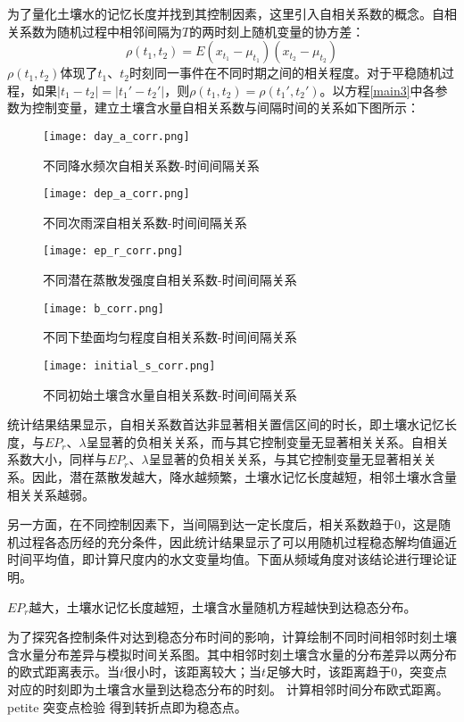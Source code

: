 为了量化土壤水的记忆长度并找到其控制因素，这里引入自相关系数的概念。自相关系数为随机过程中相邻间隔为$T$的两时刻上随机变量的协方差：
\begin{equation}
\rho(t_1,t_2)=E(x_{t_1}-\mu_{t_1})(x_{t_2}-\mu_{t_2})
\end{equation}
$\rho (t_1,t_2)$体现了$t_1$、$t_2$时刻同一事件在不同时期之间的相关程度。对于平稳随机过程，如果$|t_1-t_2|=|t_1'-t_2'|$，则$\rho (t_1,t_2)=\rho (t_1',t_2')$。以方程\ref{main3}中各参数为控制变量，建立土壤含水量自相关系数与间隔时间的关系如下图所示：
\begin{figure}[H]
\centering
\texttt{[image: day\_a\_corr.png]}
\caption{不同降水频次自相关系数-时间间隔关系} 
\end{figure}
\begin{figure}[H]
\centering
\texttt{[image: dep\_a\_corr.png]}
\caption{不同次雨深自相关系数-时间间隔关系} 
\end{figure}
\begin{figure}[H]
\centering
\texttt{[image: ep\_r\_corr.png]} 
\caption{不同潜在蒸散发强度自相关系数-时间间隔关系}
\end{figure}
\begin{figure}[H]
\centering
\texttt{[image: b\_corr.png]}
\caption{不同下垫面均匀程度自相关系数-时间间隔关系} 
\end{figure}
\begin{figure}[H]
\centering
\texttt{[image: initial\_s\_corr.png]} 
\caption{不同初始土壤含水量自相关系数-时间间隔关系}
\end{figure}

统计结果结果显示，自相关系数首达非显著相关置信区间的时长，即土壤水记忆长度，与$EP_r$、$\lambda$呈显著的负相关关系，而与其它控制变量无显著相关关系。自相关系数大小，同样与$EP_r$、$\lambda$呈显著的负相关关系，与其它控制变量无显著相关关系。因此，潜在蒸散发越大，降水越频繁，土壤水记忆长度越短，相邻土壤水含量相关关系越弱。

另一方面，在不同控制因素下，当间隔到达一定长度后，相关系数趋于0，这是随机过程各态历经的充分条件，因此统计结果显示了可以用随机过程稳态解均值逼近时间平均值，即计算尺度内的水文变量均值。下面从频域角度对该结论进行理论证明。



\iffalse

$EP_r$越大，土壤水记忆长度越短，土壤含水量随机方程越快到达稳态分布。 


为了探究各控制条件对达到稳态分布时间的影响，计算绘制不同时间相邻时刻土壤含水量分布差异与模拟时间关系图。其中相邻时刻土壤含水量的分布差异以两分布的欧式距离表示。当$t$很小时，该距离较大；当$t$足够大时，该距离趋于$0$，突变点对应的时刻即为土壤含水量到达稳态分布的时刻。
计算相邻时间分布欧式距离。petite 突变点检验 得到转折点即为稳态点。




